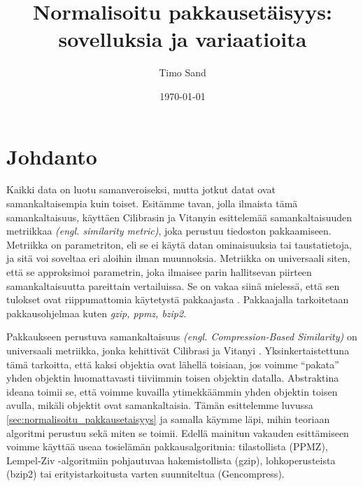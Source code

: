 \documentclass[12pt,finnish]{tktltiki2}
\title{Normalisoitu pakkausetäisyys: sovelluksia ja variaatioita}
\author{Timo Sand}
\date{\today}
\theoremstyle{definition}
\theoremstyle{remark}
\newcommand{\engl}[1]{\emph{(engl. #1)}}
\begin{document}

\frontmatter      %

\maketitle        %
\makeabstract     %

\tableofcontents  %


\mainmatter       %

\section{Johdanto} %
\label{sec:johdanto}
\label{par:intro-1}
  Kaikki data on luotu samanveroiseksi, mutta jotkut datat ovat samankaltaisempia kuin toiset.
  Esitämme tavan, jolla ilmaista tämä samankaltaisuus, käyttäen Cilibrasin ja Vitanyin esittelemää samankaltaisuuden metriikkaa \engl{similarity metric}, joka perustuu tiedoston pakkaamiseen. \cite{CV05}
  Metriikka on parametriton, eli se ei käytä datan ominaisuuksia tai taustatietoja, ja sitä voi soveltaa eri aloihin ilman muunnoksia.
  Metriikka on universaali siten, että se approksimoi parametrin, joka ilmaisee parin hallitsevan piirteen samankaltaisuutta pareittain vertailuissa.
  Se on vakaa siinä mielessä, että sen tulokset ovat riippumattomia käytetystä pakkaajasta \cite{CV05}. Pakkaajalla tarkoitetaan pakkausohjelmaa kuten \emph{gzip, ppmz, bzip2}.

  \label{par:intro-2}
  Pakkaukseen perustuva samankaltaisuus \engl{Compression-Based Similarity} on universaali metriikka, jonka kehittivät Cilibrasi ja Vitanyi \cite{CV05}.
  Yksinkertaistettuna tämä tarkoitta, että kaksi objektia ovat lähellä toisiaan, jos voimme ``pakata'' yhden objektin huomattavasti tiiviimmin toisen objektin datalla.
  Abstraktina ideana toimii se, että voimme kuvailla ytimekkäämmin yhden objektin toisen avulla, mikäli objektit ovat samankaltaisia.
  Tämän esittelemme luvussa \ref{sec:normalisoitu_pakkausetaisyys} ja samalla käymme läpi, mihin teoriaan algoritmi perustuu sekä miten se toimii.
  Edellä mainitun vakauden esittämiseen voimme käyttää useaa tosielämän pakkausalgoritmia: tilastollista (PPMZ), Lempel-Ziv -algoritmiin pohjautuvaa hakemistollista (gzip), lohkoperusteista (bzip2) tai erityistarkoitusta varten suunniteltua (Gencompress).
\end{document}
